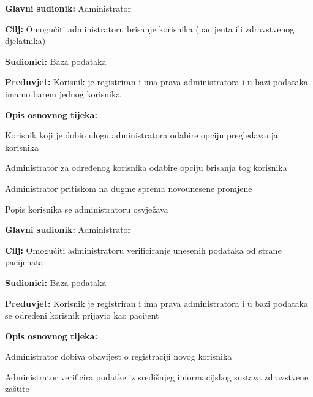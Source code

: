 \noindent {}
\begin{packed_item}
	
	\item \textbf{Glavni sudionik: }Administrator
	\item  \textbf{Cilj:} Omogućiti administratoru brisanje korisnika (pacijenta ili zdravstvenog djelatnika)
	\item  \textbf{Sudionici:} Baza podataka
	\item  \textbf{Preduvjet:} Korisnik je registriran i ima prava administratora i u bazi podataka imamo barem jednog korisnika
	\item  \textbf{Opis osnovnog tijeka:}
	
	\item[] \begin{packed_enum}
		
		\item Korisnik koji je dobio ulogu administratora odabire opciju pregledavanja korisnika
		\item Administrator za određenog korisnika odabire opciju brisanja tog korisnika
		\item Administrator pritiskom na dugme sprema novounesene promjene
		\item Popis korisnika se administratoru osvježava
	\end{packed_enum}
	
\end{packed_item}

\noindent {}
\begin{packed_item}
	
	\item \textbf{Glavni sudionik: }Administrator
	\item  \textbf{Cilj:} Omogućiti administratoru verificiranje unesenih podataka od strane pacijenata
	\item  \textbf{Sudionici:} Baza podataka
	\item  \textbf{Preduvjet:} Korisnik je registriran i ima prava administratora i u bazi podataka se određeni korisnik prijavio kao pacijent
	\item  \textbf{Opis osnovnog tijeka:}
	
	\item[] \begin{packed_enum}
		
		\item Administrator dobiva obavijest o registraciji novog korisnika
		\item Administrator verificira podatke iz središnjeg informacijskog sustava zdravstvene zaštite
	\end{packed_enum}
	
\end{packed_item}


